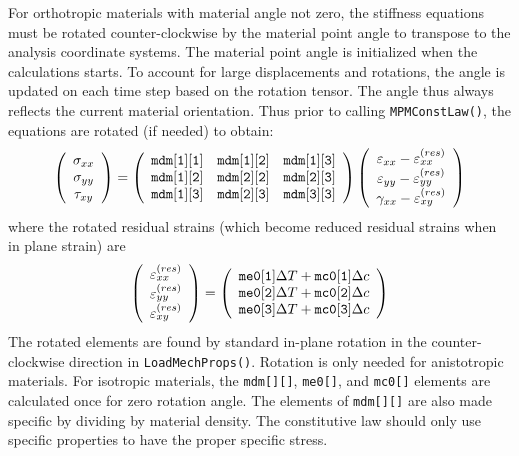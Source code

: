 \documentclass[11pt]{article}
\def\code#1{{\small\tt #1}}
\def\DT{\Delta T}
\def\e#1{\varepsilon_{#1}}
\def\er#1{\varepsilon_{#1}^{(res)}}
\def\g#1{\gamma_{#1}}
\def\s#1{\sigma_{#1}}
\def\t#1{\tau_{#1}}
\def\vvec#1#2#3{\left(\begin{array}{ccc} #1 \\ #2 \\ #3 \end{array}\right)}
\def\symmat#1#2#3#4#5#6{\left(\begin{array}{ccc} #1 & #2 & #3 \\ #2 & #4 & #5 \\
                                                      #3 & #5 & #6 \end{array}\right)}
\begin{document}
For orthotropic materials with material angle not zero, the stiffness equations must be rotated counter-clockwise by the material point angle to transpose to the analysis coordinate systems. The material point angle is initialized when the calculations starts. To account for large displacements and rotations, the angle is updated on each time step based on the rotation tensor. The angle thus always reflects the current material orientation. Thus prior to calling \code{MPMConstLaw()}, the equations are rotated (if needed) to obtain:
\begin{equation}
      \vvec{\s{xx}}{\s{yy}}{\t{xy}} = \symmat{\code{mdm[1][1]}}{\code{mdm[1][2]}}
                      {\code{mdm[1][3]}}{\code{mdm[2][2]}}{\code{mdm[2][3]}}{\code{mdm[3][3]}}
          \vvec{\e{xx} - \er{xx}}{\e{yy} - \er{yy}}{\g{xx}-\er{xy}}
 \end{equation}
 where the rotated residual strains (which become reduced residual strains when in plane strain) are
\begin{equation}
\left(\begin{array}{c} \er{xx} \\ \er{yy} \\ \er{xy} \end{array}\right)
       =  \left(\begin{array}{c}
	\code{me0[1]}\DT + \code{mc0[1]}\Delta c \\
	\code{me0[2]}\DT + \code{mc0[2]}\Delta c \\
	\code{me0[3]}\DT + \code{mc0[3]}\Delta c  \end{array}\right)
\end{equation}
 The rotated elements are found by standard in-plane rotation in the counter-clockwise direction in \code{LoadMechProps()}. Rotation is only needed for anistotropic materials. For isotropic materials, the \code{mdm[][]}, \code{me0[]}, and \code{mc0[]} elements are calculated once for zero rotation angle. The elements of \code{mdm[][]} are also made specific by dividing by material density. The constitutive law should only use specific properties to have the proper specific stress.
 
\end{document}
